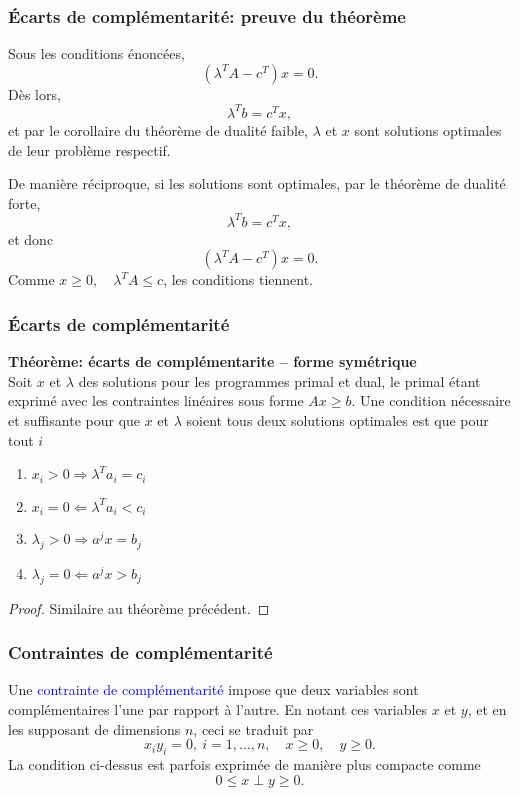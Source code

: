 \documentclass[usepdftitle=false]{beamer}
\begin{document}
\begin{frame}
	\frametitle{\'Ecarts de complémentarité: preuve du théorème}
	
	Sous les conditions énoncées,
	\[
	(\lambda^T A - c^T)x = 0.
	\]
	Dès lors,
	\[
	\lambda^T b = c^Tx,
	\]
	et par le corollaire du théorème de dualité faible, $\lambda$ et $x$ sont solutions optimales de leur problème respectif.
	
	\mbox{}
	
	De manière réciproque, si les solutions sont optimales, par le théorème de dualité forte,
	\[
	\lambda^T b = c^Tx,
	\]
	et donc
	\[
	(\lambda^T A - c^T) x = 0.
	\]
	Comme
	$x \geq 0,\quad \lambda^T A \leq c$,
	les conditions tiennent.
	
\end{frame}

\begin{frame}
	\frametitle{\'Ecarts de complémentarité}
	
	{\bf Théorème: écarts de complémentarite -- forme symétrique}\\
	Soit $x$ et $\lambda$ des solutions pour les programmes primal et dual, le primal étant exprimé avec les contraintes linéaires sous forme $Ax \geq b$. Une condition nécessaire et suffisante pour que $x$ et $\lambda$ soient tous deux solutions optimales est que pour tout $i$
	\begin{enumerate}
		\item
		$x_i > 0 \Rightarrow \lambda^T a_i = c_i$
		\item
		$x_i = 0 \Leftarrow \lambda^T a_i < c_i$
		\item
		$\lambda_j > 0 \Rightarrow a^j x = b_j$
		\item
		$\lambda_j = 0 \Leftarrow a^j x > b_j$
	\end{enumerate}
	
	\begin{proof}
		Similaire au théorème précédent.
	\end{proof}
	
\end{frame}

\begin{frame}
	\frametitle{Contraintes de complémentarité}
	
	Une \textcolor{blue}{contrainte de complémentarité} impose que deux variables sont complémentaires l'une par rapport à l'autre.
	En notant ces variables $x$ et $y$, et en les supposant de dimensions $n$, ceci se traduit par
	$$
	x_iy_i = 0,\ i = 1,\ldots,n, \quad x \ge 0, \quad y \ge 0.
	$$
	La condition ci-dessus est parfois exprimée de manière plus compacte comme
	$$
	0 \leq x \perp y \geq 0.
	$$
	
\end{frame}
\end{document}

